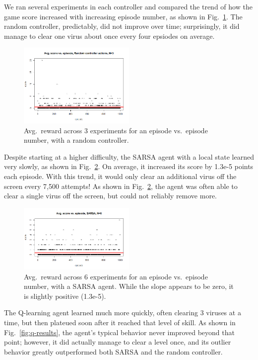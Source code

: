 \documentclass[letterpaper]{article} %
\begin{document}
We ran several experiments in each controller and compared the trend of how the game score increased with increasing episode number, as shown in Fig.~\ref{fig:random-results}. The random controller, predictably, did not improve over time; surprisingly, it did manage to clear one virus about once every four epsiodes on average.

\begin{figure}
\includegraphics[width=0.5\textwidth]{random_results_n3.png}
\caption{Avg.~reward across 3 experiments for an episode vs.~episode number, with a random controller.}\label{fig:random-results}
\end{figure}

Despite starting at a higher difficulty, the SARSA agent with a local state learned very slowly, as shown in Fig.~\ref{fig:sarsa-results}. On average, it increased its score by 1.3e-5 points each episode. With this trend, it would only clear an additional virus off the screen every 7,500 attempts! As shown in Fig.~\ref{fig:sarsa-results}, the agent was often able to clear a single virus off the screen, but could not reliably remove more.

\begin{figure}
\includegraphics[width=0.5\textwidth]{sarsa_results_n6.png}
\caption{Avg.~reward across 6 experiments for an episode vs.~episode number, with a SARSA agent. While the slope appears to be zero, it is slightly positive (1.3e-5).}\label{fig:sarsa-results}
\end{figure}

The Q-learning agent learned much more quickly, often clearing 3 viruses at a time, but then plateued soon after it reached that level of skill. As shown in Fig.~\ref{fig:q-results}, the agent's typical behavior never improved beyond that point; however, it did actually manage to clear a level once, and its outlier behavior greatly outperformed both SARSA and the random controller.
\end{document}
